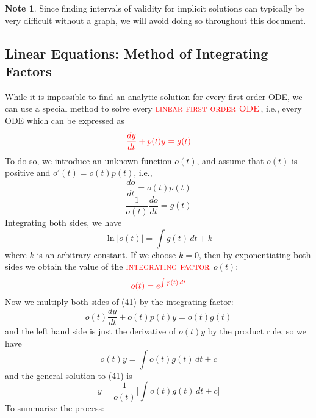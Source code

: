 \documentclass[11pt]{article}
\theoremstyle{definition}
\newtheorem*{note*}{Note}
\begin{document}
\begin{note*}
    Since finding intervals of validity for implicit solutions can typically be very difficult without a graph, we will avoid doing so throughout this document.
\end{note*}
\subsection{Linear Equations: Method of Integrating Factors}
While it is impossible to find an analytic solution for every first order ODE, we can use a special method to solve every $\color{red}{\textsc{linear first order ODE}}$, i.e., every ODE which can be expressed as \begin{equation}
    \color{red}{\frac{dy}{dt} + p(t)y = g(t)}
\end{equation}
To do so, we introduce an unknown function $o(t)$, and assume that $o(t)$ is positive and $o'(t) = o(t)p(t)$, i.e., \begin{equation}
    \frac{do}{dt} = o(t)p(t)
\end{equation} \begin{equation}
    \frac{1}{o(t)}\frac{do}{dt} = g(t)
\end{equation} Integrating both sides, we have \begin{equation}
    \ln{|o(t)|} = \int g(t)\,dt + k
\end{equation} where $k$ is an arbitrary constant. If we choose $k = 0$, then by exponentiating both sides we obtain the value of the $\color{red}{\textsc{integrating factor}}$ $o(t)$: \begin{equation}
    \color{red}{o(t) = e^{\int p(t)\,dt}}
\end{equation}Now we multiply both sides of (41) by the integrating factor:\begin{equation}
    o(t)\frac{dy}{dt} + o(t)p(t)y = o(t)g(t)
\end{equation} and the left hand side is just the derivative of $o(t)y$ by the product rule, so we have \begin{equation}
    o(t)y = \int o(t)g(t)\,dt + c
\end{equation} and the general solution to (41) is \begin{equation}
    y = \frac{1}{o(t)}\Bigg[\int o(t)g(t)\,dt + c\Bigg]
\end{equation}To summarize the process:
\end{document}
